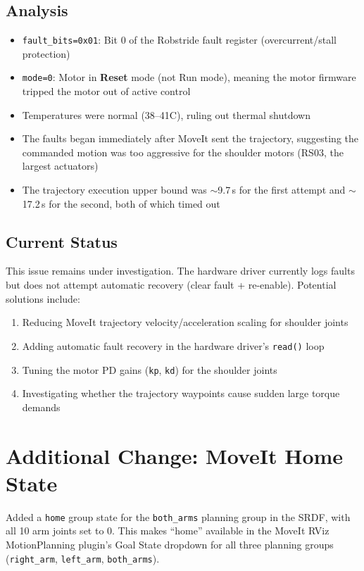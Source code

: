 \documentclass[11pt,a4paper]{article}
\begin{document}
\subsection{Analysis}
\begin{itemize}
  \item \texttt{fault\_bits=0x01}: Bit 0 of the Robstride fault register (overcurrent/stall protection)
  \item \texttt{mode=0}: Motor in \textbf{Reset} mode (not Run mode), meaning the motor
    firmware tripped the motor out of active control
  \item Temperatures were normal (38--41\textdegree C), ruling out thermal shutdown
  \item The faults began immediately after MoveIt sent the trajectory, suggesting the
    commanded motion was too aggressive for the shoulder motors (RS03, the largest actuators)
  \item The trajectory execution upper bound was $\sim$9.7\,s for the first attempt and
    $\sim$17.2\,s for the second, both of which timed out
\end{itemize}

\subsection{Current Status}
This issue remains under investigation. The hardware driver currently logs faults but
does not attempt automatic recovery (clear fault + re-enable). Potential solutions include:

\begin{enumerate}
  \item Reducing MoveIt trajectory velocity/acceleration scaling for shoulder joints
  \item Adding automatic fault recovery in the hardware driver's \texttt{read()} loop
  \item Tuning the motor PD gains (\texttt{kp}, \texttt{kd}) for the shoulder joints
  \item Investigating whether the trajectory waypoints cause sudden large torque demands
\end{enumerate}

\section{Additional Change: MoveIt Home State}

Added a \texttt{home} group state for the \texttt{both\_arms} planning group in the SRDF,
with all 10 arm joints set to 0. This makes ``home'' available in the MoveIt RViz
MotionPlanning plugin's Goal State dropdown for all three planning groups
(\texttt{right\_arm}, \texttt{left\_arm}, \texttt{both\_arms}).
\end{document}
